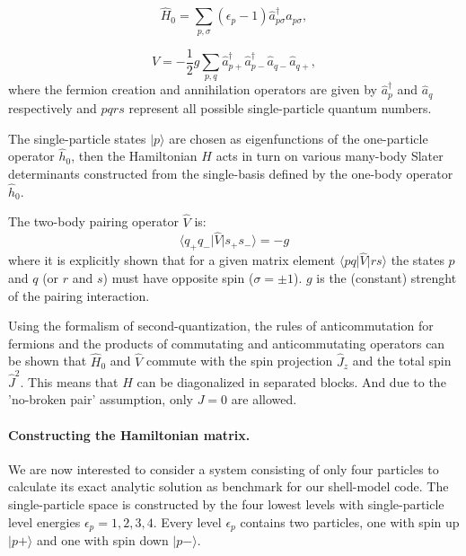 \documentclass[twoside]{article}
\begin{document}
\begin{equation}
\hat H_0 =  \sum_{p,\sigma} (\epsilon_p-1) \hat a_{p\sigma}^\dagger \hat a_{p\sigma},
\label{eq:H_0}
\end{equation}

\begin{equation}
\hat V = -\frac{1}{2} g \sum_{p,q} \hat a_{p+}^\dagger \hat a_{p-}^\dagger \hat a_{q-} \hat a_{q+} ,\label{eq:V}
\end{equation}
where the fermion creation and annihilation operators are given by $\hat a_{p}^\dagger$ and $\hat a_{q}$ respectively and $pqrs$ represent all possible single-particle quantum numbers.

The single-particle states $\vert p \rangle$ are chosen as eigenfunctions of the one-particle operator $\hat{h}_0$, then the Hamiltonian $H$ acts in turn on various many-body Slater determinants constructed from the single-basis defined by the one-body operator $\hat{h}_0$.

The two-body pairing operator $\hat{V}$ is:
\begin{equation}
\langle q_+ q_- \vert \hat{V} \vert s_+s_- \rangle = -g
\end{equation}
where it is explicitly shown that for a given matrix element $\langle pq \vert \hat{V} \vert rs \rangle$ the states $p$ and $q$ (or $r$ and $s$) must have opposite spin ($\sigma=\pm 1$). $g$ is the (constant) strenght of the pairing interaction.

Using the formalism of second-quantization, the rules of anticommutation for fermions and the products of commutating and anticommutating operators can be shown that $\hat{H}_0$ and $\hat{V}$ commute with the spin projection $\hat{J}_z$ and the total spin $\hat{J}^2$. This means that $H$ can be diagonalized in separated blocks. And due to the 'no-broken pair' assumption, only $J = 0$ are allowed.


\paragraph{Constructing the Hamiltonian matrix.}

We are now interested to consider a system consisting of only four particles to calculate its exact analytic solution as benchmark for our shell-model code. The single-particle space is constructed by the four lowest levels with single-particle level energies $\epsilon_p = 1, 2, 3, 4$. Every level $\epsilon_p$ contains two particles, one with spin up $\vert p+ \rangle$ and one with spin down $\vert p- \rangle$. 
\end{document}
